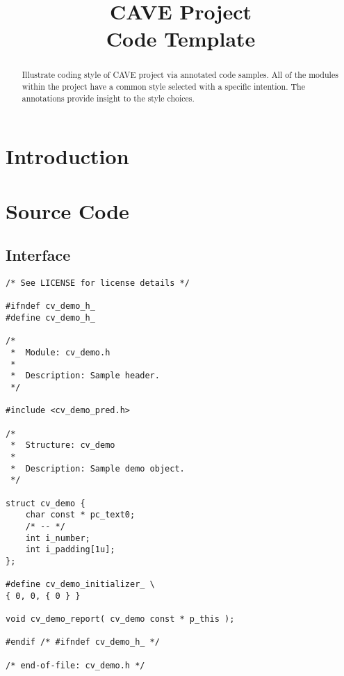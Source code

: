 \title{CAVE Project \\
Code Template}





\maketitle

\begin{abstract}

Illustrate coding style of CAVE project via annotated code samples.  All of
the modules within the project have a common style selected with a specific
intention.  The annotations provide insight to the style choices.

\end{abstract}

\tableofcontents

\lstlistoflistings

\section{Introduction}

\section{Source Code}

\subsection{Interface}

\begin{lstlisting}[caption={cv\_demo.h}]
/* See LICENSE for license details */

#ifndef cv_demo_h_
#define cv_demo_h_

/*
 *  Module: cv_demo.h
 *
 *  Description: Sample header.
 */

#include <cv_demo_pred.h>

/*
 *  Structure: cv_demo
 *
 *  Description: Sample demo object.
 */

struct cv_demo {
    char const * pc_text0;
    /* -- */
    int i_number;
    int i_padding[1u];
};

#define cv_demo_initializer_ \
{ 0, 0, { 0 } }

void cv_demo_report( cv_demo const * p_this );

#endif /* #ifndef cv_demo_h_ */

/* end-of-file: cv_demo.h */
\end{lstlisting}

